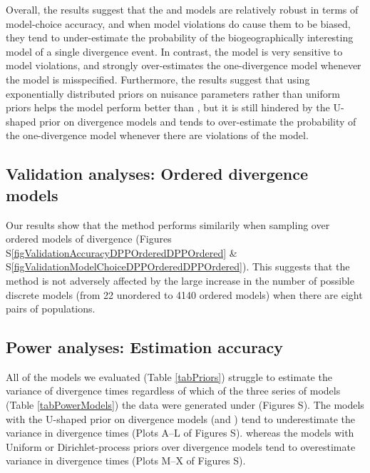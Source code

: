 Overall, the results suggest that the \modelDPP and \modelUniform models are
relatively robust in terms of model-choice accuracy, and when model violations
do cause them to be biased, they tend to under-estimate the probability of the
biogeographically interesting model of a single divergence event.
In contrast, the \modelOld model is very sensitive to model violations, and
strongly over-estimates the one-divergence model whenever the model is
misspecified.
Furthermore, the results suggest that using exponentially distributed priors on
nuisance parameters rather than uniform priors helps the \modelUshaped model
perform better than \modelOld, but it is still hindered by the U-shaped prior
on divergence models and tends to over-estimate the probability of the
one-divergence model whenever there are violations of the model.


\subsection*{Validation analyses: Ordered divergence models}
Our results show that the method performs similarily when sampling over ordered
models of divergence
(Figures S\ref{figValidationAccuracyDPPOrderedDPPOrdered} \&
S\ref{figValidationModelChoiceDPPOrderedDPPOrdered}).
This suggests that the method is not adversely affected by the large increase
in the number of possible discrete models (from 22 unordered to 4140 ordered
models) when there are eight pairs of populations.

\subsection*{Power analyses: Estimation accuracy}
All of the models we evaluated (Table \ref{tabPriors}) struggle to estimate the
variance of divergence times \divTimeDispersion regardless of which of the
three series of models (Table \ref{tabPowerModels}) the data were generated
under
(Figures
S).
The models with the U-shaped prior on divergence models (\modelOld and
\modelUshaped) tend to underestimate the variance in divergence times 
(Plots A--L of Figures
S).
whereas the models with Uniform or Dirichlet-process priors over divergence
models tend to overestimate variance in divergence times
(Plots M--X of Figures
S).

